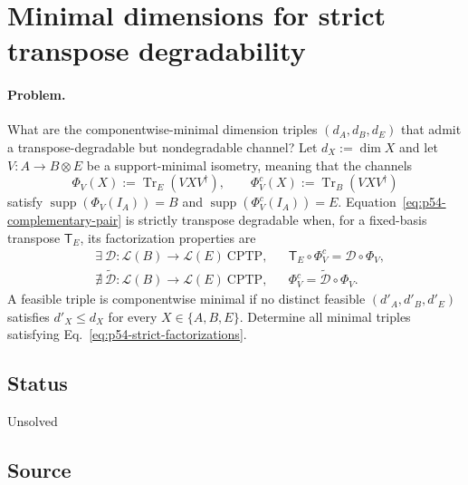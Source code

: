 \section{Minimal dimensions for strict transpose degradability}
\label{sec:op_b315f0d0b6ddbdee}

\paragraph{Problem.}
What are the componentwise-minimal dimension triples
$(d_A,d_B,d_E)$ that admit a transpose-degradable but nondegradable channel?
Let $d_X:=\dim X$ and let $V:A\to B\otimes E$ be a support-minimal isometry,
meaning that the channels
\begin{equation}
  \Phi_V(X):=\operatorname{Tr}_E(VXV^\dagger),
  \qquad
  \Phi_V^c(X):=\operatorname{Tr}_B(VXV^\dagger)
  \label{eq:p54-complementary-pair}
\end{equation}
satisfy
$\operatorname{supp}(\Phi_V(I_A))=B$ and
$\operatorname{supp}(\Phi_V^c(I_A))=E$.
Equation~\eqref{eq:p54-complementary-pair} is strictly transpose degradable
when, for a fixed-basis transpose $\mathsf T_E$, its factorization properties
are
\begin{equation}
  \begin{aligned}
    &\exists\ \mathcal D:\mathcal L(B)\to\mathcal L(E)\ \text{CPTP},
    &&\mathsf T_E\circ\Phi_V^c=\mathcal D\circ\Phi_V,\\
    &\nexists\ \widetilde{\mathcal D}:\mathcal L(B)\to\mathcal L(E)\
      \text{CPTP},
    &&\Phi_V^c=\widetilde{\mathcal D}\circ\Phi_V.
  \end{aligned}
  \label{eq:p54-strict-factorizations}
\end{equation}
A feasible triple is componentwise minimal if no distinct feasible
$(d'_A,d'_B,d'_E)$ satisfies $d'_X\leq d_X$ for every $X\in\{A,B,E\}$.
Determine all minimal triples satisfying
Eq.~\eqref{eq:p54-strict-factorizations}.

\subsection*{Status}

Unsolved

\subsection*{Source}


